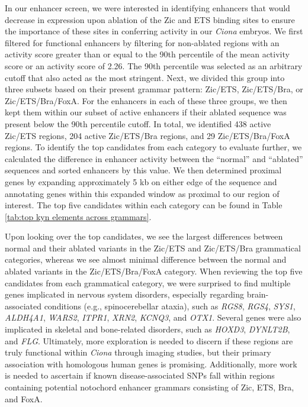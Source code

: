In our enhancer screen, we were interested in identifying enhancers that would decrease in expression upon ablation of the Zic and ETS binding sites to ensure the importance of these sites in conferring activity in our \textit{Ciona} embryos. We first filtered for functional enhancers by filtering for non-ablated regions with an activity score greater than or equal to the 90th percentile of the mean activity score or an activity score of 2.26. The 90th percentile was selected as an arbitrary cutoff that also acted as the most stringent. Next, we divided this group into three subsets based on their present grammar pattern: Zic/ETS, Zic/ETS/Bra, or Zic/ETS/Bra/FoxA. For the enhancers in each of these three groups, we then kept them within our subset of active enhancers if their ablated sequence was present below the 90th percentile cutoff. In total, we identified 438 active Zic/ETS regions, 204 active Zic/ETS/Bra regions, and 29 Zic/ETS/Bra/FoxA regions. To identify the top candidates from each category to evaluate further, we calculated the difference in enhancer activity between the “normal” and “ablated” sequences and sorted enhancers by this value. We then determined proximal genes by expanding approximately 5 kb on either edge of the sequence and annotating genes within this expanded window as proximal to our region of interest. The top five candidates within each category can be found in Table \ref{tab:top kyn elements across grammars}.

Upon looking over the top candidates, we see the largest differences between normal and their ablated variants in the Zic/ETS and Zic/ETS/Bra grammatical categories, whereas we see almost minimal difference between the normal and ablated variants in the Zic/ETS/Bra/FoxA category. When reviewing the top five candidates from each grammatical category, we were surprised to find multiple genes implicated in nervous system disorders, especially regarding brain-associated conditions (e.g., spinocerebellar ataxia), such as \textit{RGS8}, \textit{RGS4}, \textit{SYS1}, \textit{ALDH4A1}, \textit{WARS2}, \textit{ITPR1}, \textit{XRN2}, \textit{KCNQ3}, and \textit{OTX1}. Several genes were also implicated in skeletal and bone-related disorders, such as \textit{HOXD3}, \textit{DYNLT2B}, and \textit{FLG}. Ultimately, more exploration is needed to discern if these regions are truly functional within \textit{Ciona} through imaging studies, but their primary association with homologous human genes is promising. Additionally, more work is needed to ascertain if known disease-associated SNPs fall within regions containing potential notochord enhancer grammars consisting of Zic, ETS, Bra, and FoxA. 

